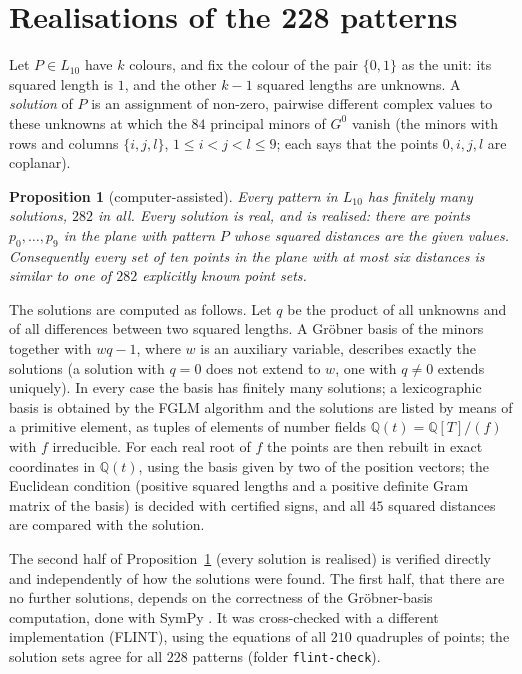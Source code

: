 \documentclass[11pt]{amsart}
\newtheorem{proposition}[theorem]{Proposition}
\theoremstyle{definition}
\theoremstyle{remark}
\newcommand{\Q}{\mathbb{Q}}
\begin{document}
\section{Realisations of the 228 patterns}\label{sec:realisations}

Let $P\in L_{10}$ have $k$ colours, and fix the colour of the pair $\{0,1\}$ as the unit: its squared length
is $1$, and the other $k-1$ squared lengths are unknowns. A \emph{solution} of $P$ is an assignment of
non-zero, pairwise different complex values to these unknowns at which the $84$ principal minors of $G^0$
vanish (the minors with rows and columns $\{i,j,l\}$, $1\le i<j<l\le9$; each says that the points
$0,i,j,l$ are coplanar).

\begin{proposition}[computer-assisted]\label{prop:B}
Every pattern in $L_{10}$ has finitely many solutions, $282$ in all. Every solution is real, and is
realised: there are points $p_0,\dots,p_9$ in the plane with pattern $P$ whose squared distances are the
given values. Consequently every set of ten points in the plane with at most six distances is similar to
one of $282$ explicitly known point sets.
\end{proposition}

The solutions are computed as follows. Let $q$ be the product of all unknowns and of all differences
between two squared lengths. A Gröbner basis of the minors together with $wq-1$, where $w$ is an auxiliary
variable, describes exactly the solutions (a solution with $q=0$ does not extend to $w$, one with $q\neq0$
extends uniquely). In every case the basis has finitely many solutions; a lexicographic basis is obtained
by the FGLM algorithm and the solutions are listed by means of a primitive element, as tuples of elements
of number fields $\Q(t)=\Q[T]/(f)$ with $f$ irreducible. For each real root of $f$ the points are then
rebuilt in exact coordinates in $\Q(t)$, using the basis given by two of the position vectors; the
Euclidean condition (positive squared lengths and a positive definite Gram matrix of the basis) is
decided with certified signs, and all $45$ squared distances are compared with the solution.

The second half of Proposition~\ref{prop:B} (every solution is realised) is verified directly and
independently of how the solutions were found. The first half, that there are no further solutions,
depends on the correctness of the Gröbner-basis computation, done with SymPy \cite{sympy}. It was
cross-checked with a different implementation (FLINT), using the equations of all $210$ quadruples of
points; the solution sets agree for all $228$ patterns (folder \texttt{flint-check}).
\end{document}
